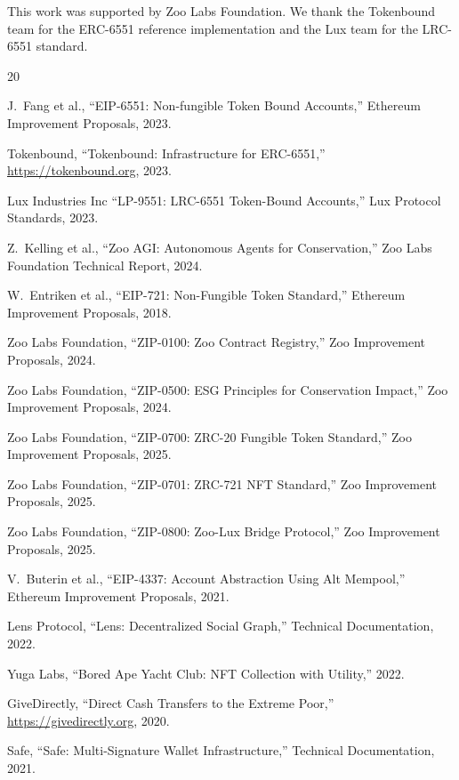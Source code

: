 \documentclass[11pt,letterpaper]{article}
\begin{document}
This work was supported by Zoo Labs Foundation. We thank the Tokenbound team for the ERC-6551 reference implementation and the Lux team for the LRC-6551 standard.


\begin{thebibliography}{20}

J.~Fang et al., ``EIP-6551: Non-fungible Token Bound Accounts,'' Ethereum Improvement Proposals, 2023.

Tokenbound, ``Tokenbound: Infrastructure for ERC-6551,'' \url{https://tokenbound.org}, 2023.

Lux Industries Inc ``LP-9551: LRC-6551 Token-Bound Accounts,'' Lux Protocol Standards, 2023.

Z.~Kelling et al., ``Zoo AGI: Autonomous Agents for Conservation,'' Zoo Labs Foundation Technical Report, 2024.

W.~Entriken et al., ``EIP-721: Non-Fungible Token Standard,'' Ethereum Improvement Proposals, 2018.

Zoo Labs Foundation, ``ZIP-0100: Zoo Contract Registry,'' Zoo Improvement Proposals, 2024.

Zoo Labs Foundation, ``ZIP-0500: ESG Principles for Conservation Impact,'' Zoo Improvement Proposals, 2024.

Zoo Labs Foundation, ``ZIP-0700: ZRC-20 Fungible Token Standard,'' Zoo Improvement Proposals, 2025.

Zoo Labs Foundation, ``ZIP-0701: ZRC-721 NFT Standard,'' Zoo Improvement Proposals, 2025.

Zoo Labs Foundation, ``ZIP-0800: Zoo-Lux Bridge Protocol,'' Zoo Improvement Proposals, 2025.

V.~Buterin et al., ``EIP-4337: Account Abstraction Using Alt Mempool,'' Ethereum Improvement Proposals, 2021.

Lens Protocol, ``Lens: Decentralized Social Graph,'' Technical Documentation, 2022.

Yuga Labs, ``Bored Ape Yacht Club: NFT Collection with Utility,'' 2022.

GiveDirectly, ``Direct Cash Transfers to the Extreme Poor,'' \url{https://givedirectly.org}, 2020.

Safe, ``Safe: Multi-Signature Wallet Infrastructure,'' Technical Documentation, 2021.


\end{thebibliography}
\end{document}
